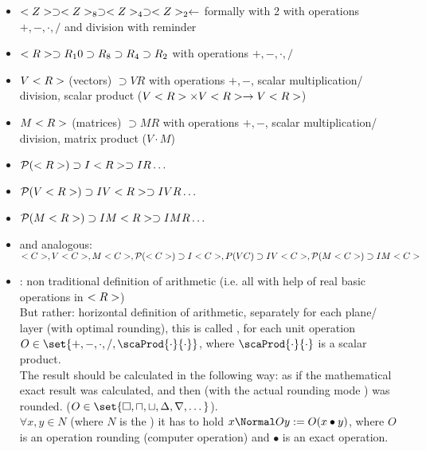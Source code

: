 \begin{itemize}
	\item $<Z>\supset <Z>_8\supset <Z>_4 \supset <Z>_2 \gets$ formally with 2 with operations $+,-, \cdot, /$ and division with reminder
	\item $<R> \supset R_10 \supset R_8 \supset R_4 \supset R_2$ with operations $+,-, \cdot, /$
	\item $V<R>$ (vectors) $\supset VR$ with operations $+,-$, scalar multiplication/ division, scalar product ($V<R> \times V<R> \to V<R>$)
	\item $M<R>$ (matrices) $\supset  MR$ with operations $+,-$, scalar multiplication/ division, matrix product ($V \cdot M$)
	\item $\mathcal{P}(<R>) \supset I<R> \supset IR \dots$
	\item $\mathcal{P}(V<R>) \supset  IV<R> \supset IVR \dots$
	\item $\mathcal{P}(M<R>) \supset  IM<R> \supset IMR \dots$
	\item and analogous: $<C>, V<C>, M<C>, \mathcal{P}(<C>) \supset I<C>, P(VC) \supset IV<C>, \mathcal{P}(M<C>) \supset  IM<C>$
	\item {}: non traditional definition of arithmetic (i.e. all with help of real basic operations in $<R>$)\\
	But rather: horizontal definition of arithmetic, separately for each plane/ layer (with optimal rounding), this is called , for each unit operation $O \in \set{+,-, \cdot,/,\scaProd{\cdot}{\cdot}}$, where $\scaProd{\cdot}{\cdot}$ is a scalar product.\\
	The result should be calculated in the following way: as if the mathematical exact result was calculated, and then (with the actual rounding mode ) was rounded. ($O \in \set{\square, \sqcap, \sqcup, \rndup, \rnddown, \dots}$).\\
	$\forall x,y\in N$ (where $N$ is the ) it has to hold $x\compop{\cdot} y:= O(x \bullet y)$, where $O$ is an operation rounding (computer operation) and $\bullet$ is an exact operation.
\end{itemize}
